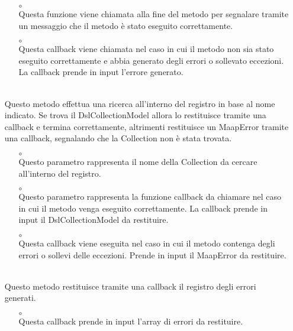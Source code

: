 \begin{itemize}
\begin{itemize}
\item[$\circ$]  \\ Questa funzione viene chiamata alla fine del metodo per segnalare tramite un messaggio che il metodo è stato eseguito correttamente.
\item[$\circ$]  \\ Questa callback viene chiamata nel caso in cui il metodo non sia stato eseguito correttamente e abbia generato degli errori o sollevato eccezioni. La callback prende in input l'errore generato.
\end{itemize}
\item[]  \\ Questo metodo effettua una ricerca all'interno del registro in base al nome indicato. Se trova il DslCollectionModel allora lo restituisce tramite una callback e termina correttamente, altrimenti restituisce un MaapError tramite una callback, segnalando che la Collection non è stata trovata.
\begin{itemize}\addtolength{\itemsep}{-0.5\baselineskip}
\item[$\circ$]  \\ Questo parametro rappresenta il nome della Collection da cercare all'interno del registro.
\item[$\circ$]  \\ Questo parametro rappresenta la funzione callback da chiamare nel caso in cui il metodo venga eseguito correttamente. La callback prende in input il DslCollectionModel da restituire.
\item[$\circ$]  \\ Questa callback viene eseguita nel caso in cui il metodo contenga degli errori o sollevi delle eccezioni. Prende in input il MaapError da restituire.
\end{itemize}
\item[]  \\ Questo metodo restituisce tramite una callback il registro degli errori generati.
\begin{itemize}\addtolength{\itemsep}{-0.5\baselineskip}
\item[$\circ$]  \\ Questa callback prende in input l'array di errori da restituire.
\end{itemize}
\end{itemize}

